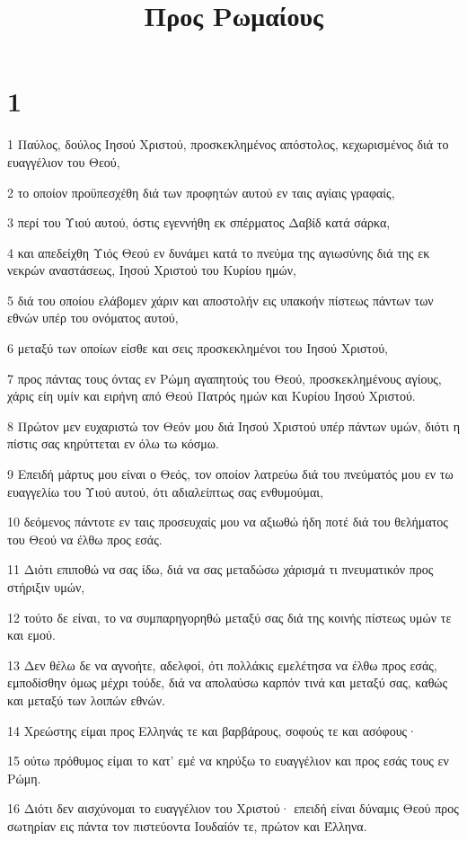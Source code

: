 

\title{Προς Ρωμαίους}


\chapter{1}

\par 1 Παύλος, δούλος Ιησού Χριστού, προσκεκλημένος απόστολος, κεχωρισμένος διά το ευαγγέλιον του Θεού,
\par 2 το οποίον προϋπεσχέθη διά των προφητών αυτού εν ταις αγίαις γραφαίς,
\par 3 περί του Υιού αυτού, όστις εγεννήθη εκ σπέρματος Δαβίδ κατά σάρκα,
\par 4 και απεδείχθη Υιός Θεού εν δυνάμει κατά το πνεύμα της αγιωσύνης διά της εκ νεκρών αναστάσεως, Ιησού Χριστού του Κυρίου ημών,
\par 5 διά του οποίου ελάβομεν χάριν και αποστολήν εις υπακοήν πίστεως πάντων των εθνών υπέρ του ονόματος αυτού,
\par 6 μεταξύ των οποίων είσθε και σεις προσκεκλημένοι του Ιησού Χριστού,
\par 7 προς πάντας τους όντας εν Ρώμη αγαπητούς του Θεού, προσκεκλημένους αγίους, χάρις είη υμίν και ειρήνη από Θεού Πατρός ημών και Κυρίου Ιησού Χριστού.
\par 8 Πρώτον μεν ευχαριστώ τον Θεόν μου διά Ιησού Χριστού υπέρ πάντων υμών, διότι η πίστις σας κηρύττεται εν όλω τω κόσμω.
\par 9 Επειδή μάρτυς μου είναι ο Θεός, τον οποίον λατρεύω διά του πνεύματός μου εν τω ευαγγελίω του Υιού αυτού, ότι αδιαλείπτως σας ενθυμούμαι,
\par 10 δεόμενος πάντοτε εν ταις προσευχαίς μου να αξιωθώ ήδη ποτέ διά του θελήματος του Θεού να έλθω προς εσάς.
\par 11 Διότι επιποθώ να σας ίδω, διά να σας μεταδώσω χάρισμά τι πνευματικόν προς στήριξιν υμών,
\par 12 τούτο δε είναι, το να συμπαρηγορηθώ μεταξύ σας διά της κοινής πίστεως υμών τε και εμού.
\par 13 Δεν θέλω δε να αγνοήτε, αδελφοί, ότι πολλάκις εμελέτησα να έλθω προς εσάς, εμποδίσθην όμως μέχρι τούδε, διά να απολαύσω καρπόν τινά και μεταξύ σας, καθώς και μεταξύ των λοιπών εθνών.
\par 14 Χρεώστης είμαι προς Ελληνάς τε και βαρβάρους, σοφούς τε και ασόφους·
\par 15 ούτω πρόθυμος είμαι το κατ' εμέ να κηρύξω το ευαγγέλιον και προς εσάς τους εν Ρώμη.
\par 16 Διότι δεν αισχύνομαι το ευαγγέλιον του Χριστού· επειδή είναι δύναμις Θεού προς σωτηρίαν εις πάντα τον πιστεύοντα Ιουδαίόν τε, πρώτον και Έλληνα.
